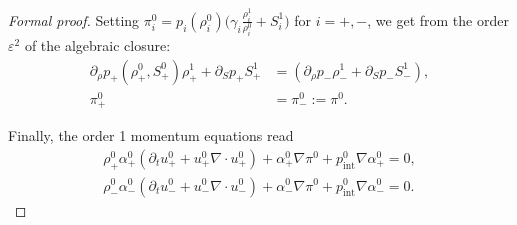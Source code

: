 \documentclass[10pt,a4paper]{amsart}
\newcommand{\am}{\alpha_-}
\newcommand{\ap}{\alpha_+}
\newcommand{\dt}{\partial_t}
\newcommand{\eps}{\varepsilon}
\newcommand{\rmi}{\rho_-}
\newcommand{\rp}{\rho_+}
\begin{document}
\begin{proof}[Formal proof]
Setting $\pi_i^0 = p_i(\rho_i^0) \Big( \gamma_i \frac{\rho_i^1}{\rho_i^0} + S_i^1 \Big)$ for $i=+,-$, we get from the order $\eps^2$ of the algebraic closure:
\begin{align*}
    \partial_\rho p_+(\rp^0,S_+^0)\rp^1 + \partial_S p_+ S_+^1 &= (\partial_\rho p_- \rmi^1 + \partial_S p_- S_-^1),\\
    \pi_+^0 &= \pi_-^0 := \pi^0. 
\end{align*}

Finally, the order 1 momentum equations read
\begin{align*}
    \rp^0 \ap^0 ( \dt u_+^0 + u_+^0 \nabla \cdot u_+^0) + \ap^0 \nabla \pi^0 + p_{\mathrm{int}}^0 \nabla \ap^0 = 0,\\
    \rmi^0 \am^0 (\dt u_-^0 + u_-^0 \nabla \cdot u_-^0) + \am^0 \nabla \pi^0 + p_{\mathrm{int}}^0 \nabla \am^0 = 0.
\end{align*}

\end{proof}
\end{document}
